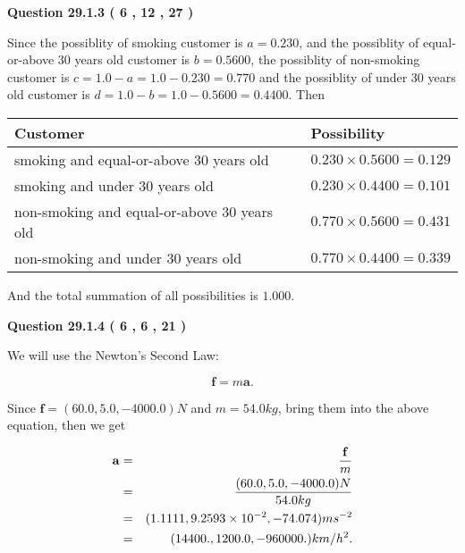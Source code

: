 \documentclass[12pt]{article}
\begin{document}
  
  
\vspace{0.2in}
  
{\textbf{\Large{Question
29.1.3 
 (           6 ,          12 ,          27 )
}}}
  
  
 
 

Since the possiblity of  %
smoking customer is $ a =  %
0.230 $,
and the possiblity of  %
equal-or-above 30 years old customer is $ b =  %
0.5600 $,
the possiblity of  %
non-smoking customer is $ c = 1.0 - a = 1.0 -
0.230
=  %
0.770 $ and the possiblity of  %
under 30 years old
customer is $ d = 1.0 - b = 1.0 -  %
0.5600 =  %
0.4400  $.
Then
 
\noindent
\begin{tabular}{|l|l|}
\hline
Customer & Possibility \\
\hline
smoking  and  %
equal-or-above 30 years old  &
  $ %
0.230 \times  %
0.5600 =  %
0.129$ \\
\hline
smoking  and  %
under 30 years old &
  $ %
0.230 \times  %
0.4400 =  %
0.101$ \\
\hline
 non-smoking and  %
equal-or-above 30 years old  &
  $ %
0.770 \times  %
0.5600 =  %
0.431$ \\
\hline
 non-smoking and  %
under 30 years old &
  $ %
0.770 \times  %
0.4400 =  %
0.339$ \\
\hline
\end{tabular}
 
\noindent
And the total summation of all possibilities is $  %
1.000 $.
 
 
 
 
  
\vspace{0.2in}
  
{\textbf{\Large{Question
29.1.4 
 (           6 ,           6 ,          21 )
}}}
  
  
 
 

We will use the Newton's Second Law:
 
\[
\mathbf{f}=m\mathbf{a}.
\]
 
Since $\mathbf{f}=( %
60.0,  %
5.0,  %
-4000.0 )N$
and $m= %
54.0 kg$, bring them into the above equation, then we get
 
\begin{eqnarray*}
\mathbf{a}&=&\frac{\mathbf{f}}m  \\
&=&\frac{(
60.0 ,
5.0 ,
-4000.0 )N
}{ %
54.0 kg}  \\
&=&(
1.1111 ,
9.2593 \times 10^{-2},
-74.074
)ms^{-2} \\
&=&(
14400. ,
1200.0 ,
-960000.
)km/h^2.
\end{eqnarray*}
 
\end{document}
